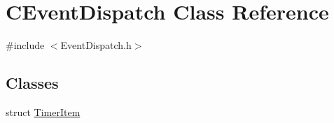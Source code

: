 \hypertarget{class_c_event_dispatch}{}\section{C\+Event\+Dispatch Class Reference}
\label{class_c_event_dispatch}


{\ttfamily \#include $<$Event\+Dispatch.\+h$>$}

\subsection*{Classes}
\begin{DoxyCompactItemize}
\item 
struct \hyperlink{struct_c_event_dispatch_1_1_timer_item}{Timer\+Item}
\end{DoxyCompactItemize}
